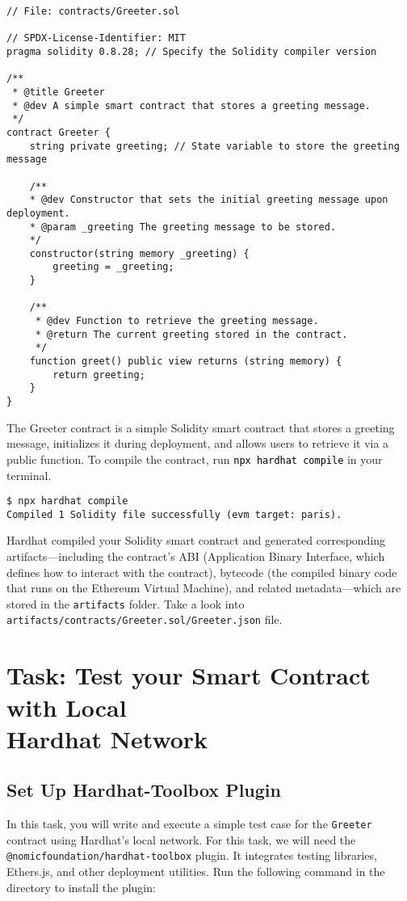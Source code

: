 \documentclass[12pt]{article}
\newcommand{\codegrey}[1]{%
  \texttt{\colorbox{black!4}{\textcolor{black}{#1}}}%
}
\begin{document}
\noindent
\begin{minipage}[c]{\textwidth}
\begin{lstlisting}[language=Solidity]
// File: contracts/Greeter.sol

// SPDX-License-Identifier: MIT
pragma solidity 0.8.28; // Specify the Solidity compiler version

/**
 * @title Greeter
 * @dev A simple smart contract that stores a greeting message.
 */
contract Greeter {
    string private greeting; // State variable to store the greeting message

    /**
    * @dev Constructor that sets the initial greeting message upon deployment.
    * @param _greeting The greeting message to be stored.
    */
    constructor(string memory _greeting) {
        greeting = _greeting;
    }

    /**
     * @dev Function to retrieve the greeting message.
     * @return The current greeting stored in the contract.
     */
    function greet() public view returns (string memory) {
        return greeting;
    }
}
\end{lstlisting}
\end{minipage}

The Greeter contract is a simple Solidity smart contract that stores a greeting message, initializes it during deployment, and allows users to retrieve it via a public function. To compile the contract, run \codegrey{npx hardhat compile} in your terminal.

\begin{verbatim}
$ npx hardhat compile
Compiled 1 Solidity file successfully (evm target: paris).
\end{verbatim}

Hardhat compiled your Solidity smart contract and generated corresponding artifacts—including the contract's ABI (Application Binary Interface, which defines how to interact with the contract), bytecode (the compiled binary code that runs on the Ethereum Virtual Machine), and related metadata—which are stored in the \texttt{artifacts} folder. Take a look into \texttt{artifacts/contracts/Greeter.sol/Greeter.json} file.

\section{Task: Test your Smart Contract with Local \\ Hardhat Network}

\subsection{Set Up Hardhat-Toolbox Plugin}
In this task, you will write and execute a simple test case for the \texttt{Greeter} contract using Hardhat's local network. For this task, we will need the \texttt{@nomicfoundation/hardhat-toolbox} plugin. It integrates testing libraries, Ethers.js, and other deployment utilities. Run the following command in the directory to install the plugin:
\end{document}
